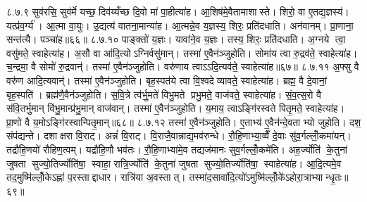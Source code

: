 ८.७.९
सुव॑रसि॒ सुव॑र्मे यच्छ॒ दिव॑य्यँच्छ दि॒वो मा॑ पा॒हीत्या॑ह। आ॒शिष॑मे॒वैतामाशास्ते। शिरो॒ वा ए॒तद्य॒ज्ञस्य॑। यत्प्र॑व॒र्ग्य॑। आ॒त्मा वा॒युः। उ॒द्यत्य॑ वातना॒मान्या॑ह। आ॒त्मन्ने॒व य॒ज्ञस्य॒ शिरः॒ प्रति॑दधाति। अन॑वानम्। प्रा॒णाना॒ सन्त॑त्यै। पञ्चा॑ह॥६६॥
८.७.१०
पाङ्क्तो॑ य॒ज्ञः। यावा॑ने॒व य॒ज्ञः। तस्य॒ शिरः॒ प्रति॑दधाति। अ॒ग्नये त्वा॒ वसु॑मते॒ स्वाहेत्या॑ह। अ॒सौ वा आ॑दि॒त्योऽग्निर्वसु॑मान्। तस्मा॑ ए॒वैन॑ञ्जुहोति। सोमा॑य त्वा रु॒द्रव॑ते॒ स्वाहेत्या॑ह। च॒न्द्रमा॒ वै सोमो॑ रु॒द्रवान्॑। तस्मा॑ ए॒वैन॑ञ्जुहोति। वरु॑णाय त्वाऽऽदि॒त्यव॑ते॒ स्वाहेत्या॑ह॥६७॥
८.७.११
अ॒फ्सु वै वरु॑ण आदि॒त्यवान्॑। तस्मा॑ ए॒वैन॑ञ्जुहोति। बृह॒स्पत॑ये त्वा वि॒श्वदेव्यावते॒ स्वाहेत्या॑ह। ब्रह्म॒ वै दे॒वानां॒ बृह॒स्पति॑। ब्रह्म॑णै॒वैन॑ञ्जुहोति। स॒वि॒त्रे त्व॑र्भु॒मते॑ विभु॒मते प्रभु॒मते॒ वाज॑वते॒ स्वाहेत्या॑ह। सं॒व॒त्स॒रो वै स॑वि॒तर्भु॒मान् वि॑भु॒मान्प्र॑भु॒मान् वाज॑वान्। तस्मा॑ ए॒वैन॑ञ्जुहोति। य॒माय॒ त्वाऽङ्गि॑रस्वते पितृ॒मते॒ स्वाहेत्या॑ह। प्रा॒णो वै य॒मोऽङ्गि॑रस्वान्पितृ॒मान्॥६८॥
८.७.१२
तस्मा॑ ए॒वैन॑ञ्जुहोति। ए॒ताभ्य॑ ए॒वैन॑न्दे॒वताभ्यो जुहोति। दश॒ संप॑द्यन्ते। दशाक्षरा वि॒राट्। अन्नं॑  वि॒राट्। वि॒राजै॒वान्नाद्य॒मव॑रुन्धे। रौ॒हि॒णाभ्या॒व्वैँ दे॒वाः सु॑व॒र्गल्लोँ॒कमा॑यन्। तद्रौ॑हि॒णयो॑ रौहिण॒त्वम्। यद्रौ॑हि॒णौ भव॑तः। रौ॒हि॒णाभ्या॑मे॒व तद्यज॑मानः सुव॒र्गल्लोँ॒कमे॑ति। अह॒र्ज्योति॑ के॒तुना॑ जुषता सुज्यो॒तिर्ज्योति॑षा॒ स्वाहा॒ रात्रि॒र्ज्योति॑ के॒तुना॑ जुषता सुज्यो॒तिर्ज्योति॑षा॒ स्वाहेत्या॑ह। आ॒दि॒त्यमे॒व तद॒मुष्मि॑ल्लोँ॒केऽह्ना॑ प॒रस्ताद्दाधार। रात्रि॑या अ॒वस्तात्। तस्मा॑द॒सावा॑दि॒त्यो॑ऽमुष्मि॑ल्लोँ॒के॑ऽहोरा॒त्राभ्यान्धृ॒तः॥६९॥
\anuvakamend

